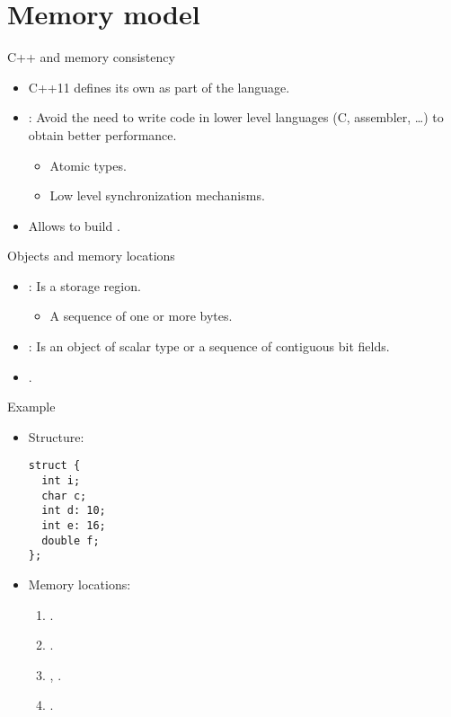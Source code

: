 \section{Memory model}

\begin{frame}[t]{C++ and memory consistency}
\begin{itemize}
  \item C++11 defines its own  as part of the language.

  \item {}: 
        Avoid the need to write code in lower level languages (C, assembler, \ldots)
        to obtain better performance.
    \begin{itemize}
      \item Atomic types.
      \item Low level synchronization mechanisms.
    \end{itemize}

  \item Allows to build .
\end{itemize}
\end{frame}

\begin{frame}[t]{Objects and memory locations}
\begin{itemize}
  \item {}: Is a storage region.
    \begin{itemize}
      \item A sequence of one or more bytes.
    \end{itemize}

  \item {}: 
        Is an object of scalar type or a sequence of contiguous bit fields.

  \item {}.
\end{itemize}
\end{frame}

\begin{frame}[t,fragile]{Example}
\begin{itemize}
  \item Structure:
\begin{lstlisting}
struct {
  int i;
  char c;
  int d: 10;
  int e: 16;
  double f;
};
\end{lstlisting}
  \item Memory locations:
    \begin{enumerate}
      \item {}.
      \item {}.
      \item {}, .
      \item {}.
    \end{enumerate}
\end{itemize}
\end{frame}

